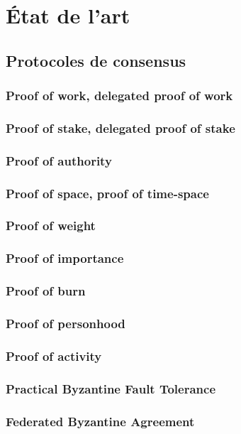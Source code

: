 \chapter{État de l'art}
\label{ch:etat_art}

\section{Protocoles de consensus}

\subsection{Proof of work, delegated proof of work}
\subsection{Proof of stake, delegated proof of stake}
\subsection{Proof of authority}
\subsection{Proof of space, proof of time-space}
\subsection{Proof of weight}
\subsection{Proof of importance}
\subsection{Proof of burn}
\subsection{Proof of personhood}
\subsection{Proof of activity}
\subsection{Practical Byzantine Fault Tolerance}
\subsection{Federated Byzantine Agreement}
